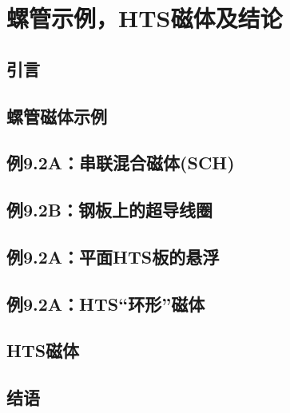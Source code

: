 \chapter{螺管示例，HTS磁体及结论}
\section{引言}




\section{螺管磁体示例}





\section*{例9.2A：串联混合磁体(SCH)}




\section*{例9.2B：钢板上的超导线圈}





\section*{例9.2A：平面HTS板的悬浮}




\section*{例9.2A：HTS“环形”磁体}




\section{HTS磁体}



\section{结语}